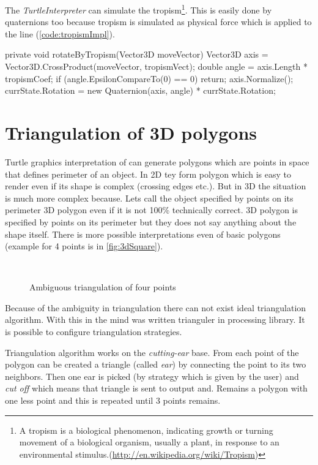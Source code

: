 The \emph{TurtleInterpreter} can simulate the tropism\footnote{A tropism is a biological phenomenon, indicating growth or turning movement of a biological organism, usually a plant, in response to an environmental stimulus.(\url{http://en.wikipedia.org/wiki/Tropism})}.
This is easily done by quaternions too because tropism is simulated as physical force which is applied to the line \cite[p.~58]{PL91} (\autoref{code:tropismImpl}).

\begin{Csharp}[label=code:tropismImpl,caption={Implementation of the tropism which is applied after each line}]
private void rotateByTropism(Vector3D moveVector) {
	Vector3D axis = Vector3D.CrossProduct(moveVector, tropismVect);
	double angle = axis.Length * tropismCoef;
	if (angle.EpsilonCompareTo(0) == 0) {
		return;
	}
	axis.Normalize();
	currState.Rotation = new Quaternion(axis, angle) * currState.Rotation;
}
\end{Csharp}


\section{Triangulation of 3D polygons}

Turtle graphics interpretation of \lsystems can generate polygons which are points in space that defines perimeter of an object.
In 2D tey form polygon which is easy to render even if its shape is complex (crossing edges etc.).
But in 3D the situation is much more complex because.
Lets call the object specified by points on its perimeter 3D polygon even if it is not 100\% technically correct.
3D polygon is specified by points on its perimeter but they does not say anything about the shape itself.
There is more possible interpretations even of basic polygons (example for 4 points is in \autoref{fig:3dSquare}).

\begin{figure}[h!]
	\hfill
	\hfill
	\hfill ~
	\caption{Ambiguous triangulation of four points}
	\label{fig:3dSquare}
\end{figure}

Because of the ambiguity in triangulation there can not exist ideal triangulation algorithm.
With this in the mind was written trianguler in \lsystem processing library.
It is possible to configure triangulation strategies.

Triangulation algorithm works on the \emph{cutting-ear} base.
From each point of the polygon can be created a triangle (called \emph{ear}) by connecting the point to its two neighbors.
Then one ear is picked (by strategy which is given by the user) and \emph{cut off} which means that triangle is sent to output and.
Remains a polygon with one less point and this is repeated until 3 points remains.

